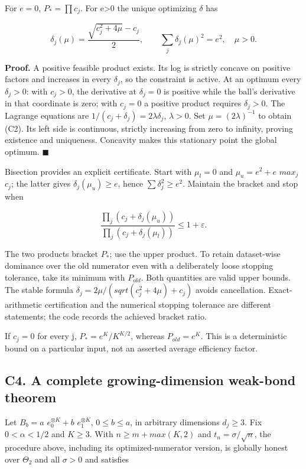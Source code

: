\documentclass[
  11pt,
]{article}
\begin{document}
For \(e=0\), \(P_*=\prod c_j\). For e\textgreater0 the unique optimizing
\(\delta\) has

\[
 \delta_j(\mu)=\frac{\sqrt{c_j^2+4\mu}-c_j}{2},\qquad
 \sum_j\delta_j(\mu)^2=e^2,\quad\mu>0. \tag{C2}
\]

\textbf{Proof.} A positive feasible product exists. Its log is strictly
concave on positive factors and increases in every \(\delta _j\), so the
constraint is active. At an optimum every \(\delta _j>0\): with
\(c_j>0\), the derivative at \(\delta _j=0\) is positive while the
ball's derivative in that coordinate is zero; with \(c_j=0\) a positive
product requires \(\delta _j>0\). The Lagrange equations are
\(1/(c_j+\delta _j)=2\lambda \delta _j\), \(\lambda >0\). Set
\(\mu =(2\lambda )^{-1}\) to obtain (C2). Its left side is continuous,
strictly increasing from zero to infinity, proving existence and
uniqueness. Concavity makes this stationary point the global optimum.
\(\blacksquare\)

Bisection provides an explicit certificate. Start with \(\mu _l=0\) and
\(\mu _u=e^{2}+e\) \(max_j\) \(c_j\); the latter gives
\(\delta _j(\mu _u)\ge e\), hence \(\sum \delta _j^{2}\ge e^{2}\).
Maintain the bracket and stop when

\[
 \frac{\prod_j(c_j+\delta_j(\mu_u))}
      {\prod_j(c_j+\delta_j(\mu_l))}\le1+\varepsilon.
\]

The two products bracket \(P_*\); use the upper product. To retain
dataset-wise dominance over the old numerator even with a deliberately
loose stopping tolerance, take its minimum with \(P_{old}\). Both
quantities are valid upper bounds. The stable formula
\(\delta _j=2\mu /(sqrt(c_j^{2}+4\mu )+c_j)\) avoids cancellation.
Exact-arithmetic certification and the numerical stopping tolerance are
different statements; the code records the achieved bracket ratio.

If \(c_j=0\) for every j, \(P_*=e^K/K^{K/2}\), whereas \(P_{old}=e^K\).
This is a deterministic bound on a particular input, not an asserted
average efficiency factor.

\subsection{C4. A complete growing-dimension weak-bond
theorem}\label{c4.-a-complete-growing-dimension-weak-bond-theorem}

Let \(B_b=a\) \(e_0^{\otimes K}+b\) \(e_1^{\otimes K}\),
\(0\le b\le a\), in arbitrary dimensions \(d_j\ge 3\). Fix
\(0<\alpha <1/2\) and \(K\ge 3\). With \(n\ge m+max(K,2)\) and
\(t_n=\sigma /\sqrt{n}\), the procedure above, including its
optimized-numerator version, is globally honest over \(\Theta _2\) and
all \(\sigma >0\) and satisfies
\end{document}
